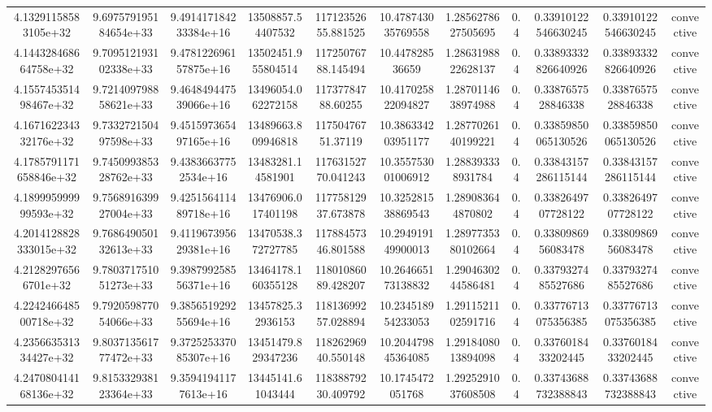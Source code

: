 \begin{table}
\begin{tabular}{ccccccccccc}
4.13291158583105e+32 & 9.697579195184654e+33 & 9.491417184233384e+16 & 13508857.54407532 & 11712352655.881525 & 10.478743035769558 & 1.2856278627505695 & 0.4 & 0.33910122546630245 & 0.33910122546630245 & convective \\
4.144328468664758e+32 & 9.709512193102338e+33 & 9.478122696157875e+16 & 13502451.955804514 & 11725076788.145494 & 10.447828536659 & 1.2863198822628137 & 0.4 & 0.33893332826640926 & 0.33893332826640926 & convective \\
4.155745351498467e+32 & 9.721409798858621e+33 & 9.464849447539066e+16 & 13496054.062272158 & 11737784788.60255 & 10.417025822094827 & 1.2870114638974988 & 0.4 & 0.3387657528846338 & 0.3387657528846338 & convective \\
4.167162234332176e+32 & 9.733272150497598e+33 & 9.451597365497165e+16 & 13489663.809946818 & 11750476751.37119 & 10.386334203951177 & 1.2877026140199221 & 0.4 & 0.33859850065130526 & 0.33859850065130526 & convective \\
4.1785791171658846e+32 & 9.745099385328762e+33 & 9.43836637752534e+16 & 13483281.14581901 & 11763152770.041243 & 10.355753001006912 & 1.288393338931784 & 0.4 & 0.33843157286115144 & 0.33843157286115144 & convective \\
4.189995999999593e+32 & 9.756891639927004e+33 & 9.425156411489718e+16 & 13476906.017401198 & 11775812937.673878 & 10.325281538869543 & 1.289083644870802 & 0.4 & 0.3382649707728122 & 0.3382649707728122 & convective \\
4.2014128828333015e+32 & 9.768649050132613e+33 & 9.411967395629381e+16 & 13470538.372727785 & 11788457346.801588 & 10.294919149900013 & 1.2897735380102664 & 0.4 & 0.3380986956083478 & 0.3380986956083478 & convective \\
4.21282976566701e+32 & 9.780371751051273e+33 & 9.398799258556371e+16 & 13464178.160355128 & 11801086089.428207 & 10.264665173138832 & 1.2904630244586481 & 0.4 & 0.3379327485527686 & 0.3379327485527686 & convective \\
4.224246648500718e+32 & 9.792059877054066e+33 & 9.385651929255694e+16 & 13457825.32936153 & 11813699257.028894 & 10.234518954233053 & 1.2911521102591716 & 0.4 & 0.33776713075356385 & 0.33776713075356385 & convective \\
4.235663531334427e+32 & 9.803713561777472e+33 & 9.372525337085307e+16 & 13451479.829347236 & 11826296940.550148 & 10.204479845364085 & 1.2918408013894098 & 0.4 & 0.3376018433202445 & 0.3376018433202445 & convective \\
4.247080414168136e+32 & 9.815332938123364e+33 & 9.35941941177613e+16 & 13445141.61043444 & 11838879230.409792 & 10.1745472051768 & 1.2925291037608508 & 0.4 & 0.33743688732388843 & 0.33743688732388843 & convective \\

\end{tabular}
\end{table}
